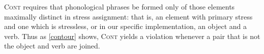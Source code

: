 \documentclass{article}
\newcommand{\noclash}{\textsc{*Clash}}
\newcommand{\cont}{\textsc{Cont}}
\begin{document}
{\cont} requires that phonological phrases be formed only of those elements maximally distinct in stress assignment: that is, an element with primary stress and one which is stressless, or in our specific implementation, an object and a verb. Thus as {\ref{contour}} shows, {\cont} yields a violation whenever a pair that is not the object and verb are joined.





\end{document}
